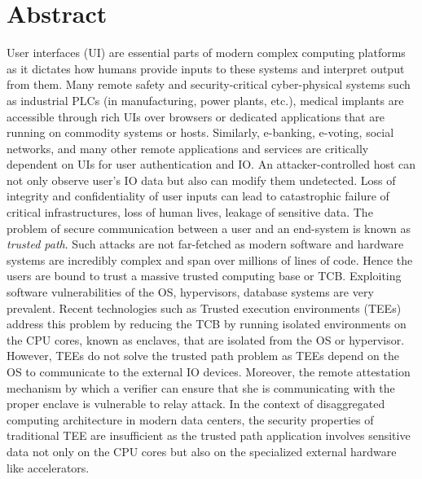 \begingroup
\let\clearpage\relax
\let\cleardoublepage\relax
\let\cleardoublepage\relax

\chapter*{Abstract}

User interfaces (UI) are essential parts of modern complex computing platforms as it dictates how humans provide inputs to these systems and interpret output from them. Many remote safety and security-critical cyber-physical systems such as industrial PLCs (in manufacturing, power plants, etc.), medical implants are accessible through rich UIs over browsers or dedicated applications that are running on commodity systems or hosts. Similarly, e-banking, e-voting, social networks, and many other remote applications and services are critically dependent on UIs for user authentication and IO. An attacker-controlled host can not only observe user's IO data but also can modify them undetected. Loss of integrity and confidentiality of user inputs can lead to catastrophic failure of critical infrastructures, loss of human lives, leakage of sensitive data. The problem of secure communication between a user and an end-system is known as \emph{trusted path}. Such attacks are not far-fetched as modern software and hardware systems are incredibly complex and span over millions of lines of code. Hence the users are bound to trust a massive trusted computing base or TCB. Exploiting software vulnerabilities of the OS, hypervisors, database systems are very prevalent. Recent technologies such as Trusted execution environments (TEEs) address this problem by reducing the TCB by running isolated environments on the CPU cores, known as enclaves, that are isolated from the OS or hypervisor. However, TEEs do not solve the trusted path problem as TEEs depend on the OS to communicate to the external IO devices. Moreover, the remote attestation mechanism by which a verifier can ensure that she is communicating with the proper enclave is vulnerable to relay attack. In the context of disaggregated computing architecture in modern data centers, the security properties of traditional TEE are insufficient as the trusted path application involves sensitive data not only on the CPU cores but also on the specialized external hardware like accelerators.



